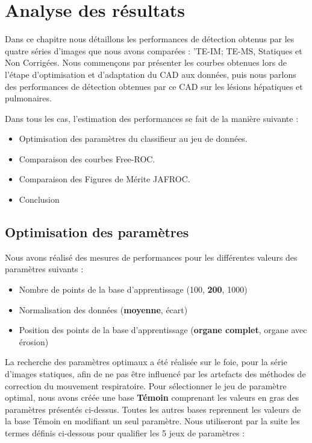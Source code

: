 

\chapter{Analyse des résultats}

Dans ce chapitre nous détaillons les performances de détection obtenus par les quatre séries d'images que nous avons comparées : 'TE-IM; TE-MS, Statiques et Non Corrigées. Nous commençons par présenter les courbes obtenues lors de l'étape d'optimisation et d'adaptation du CAD aux données, puis nous parlons des performances de détection obtenues par ce CAD sur les lésions hépatiques et pulmonaires.

Dans tous les cas, l'estimation des performances se fait de la manière suivante :

\begin{itemize}
 \item Optimisation des paramètres du classifieur au jeu de données.
 \item Comparaison des courbes Free-ROC.
 \item Comparaison des Figures de Mérite JAFROC.
 \item Conclusion
\end{itemize}


\section{Optimisation des paramètres}

Nous avons réalisé des mesures de performances pour les différentes valeurs des paramètres suivants :

\begin{itemize}
 \item Nombre de points de la base d'apprentissage (100, \textbf{200}, 1000)
 \item Normalisation des données (\textbf{moyenne}, écart)
 \item Position des points de la base d'apprentissage (\textbf{organe complet}, organe avec érosion)
\end{itemize}

La recherche des paramètres optimaux a été réalisée sur le foie, pour la série d'images statiques, afin de ne pas être influencé par les artefacts des méthodes de correction du mouvement respiratoire. Pour sélectionner le jeu de paramètre optimal, nous avons créée une base \textbf{Témoin} comprenant les valeurs en gras des paramètres présentés ci-dessus. Toutes les autres bases reprennent les valeurs de la base Témoin en modifiant un seul paramètre. Nous utiliseront par la suite les termes définis ci-dessous pour qualifier les 5 jeux de paramètres :

